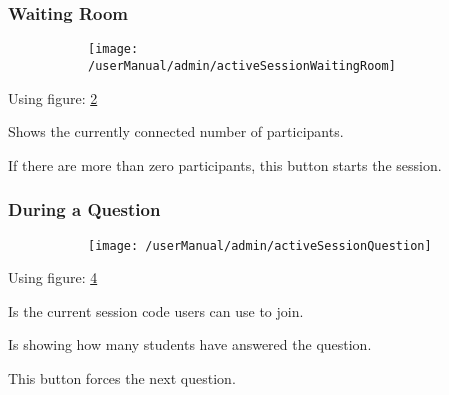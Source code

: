 \subsubsection{Waiting Room}
\begin{figure}[H]
    \centering
    \begin{subfigure}{\linewidth}
        \texttt{[image: /userManual/admin/activeSessionWaitingRoom]}
       	\caption{}
		\label{fig:activeSessionWaitingRoom}	
    \end{subfigure}
\end{figure}
Using figure: \ref{fig:activeSessionWaitingRoom}
\begin{userManualItemlist}
    \item[1] Shows the currently connected number of participants.
    \item[2] If there are more than zero participants, this button starts the session.
\end{userManualItemlist}

\subsubsection{During a Question}
\begin{figure}[H]
    \centering
    \begin{subfigure}{\linewidth}
        \texttt{[image: /userManual/admin/activeSessionQuestion]}
       	\caption{}
		\label{fig:activeSessionQuestion}	
    \end{subfigure}
\end{figure}
Using figure: \ref{fig:activeSessionQuestion}
\begin{userManualItemlist}
    \item[1] Is the current session code users can use to join.
    \item[2] Is showing how many students have answered the question.
    \item[3] This button forces the next question.  
\end{userManualItemlist}

